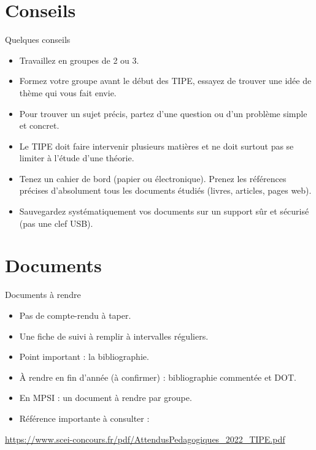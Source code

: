 \documentclass{beamer}
\begin{document}
\section{Conseils}
\begin{frame}{Quelques conseils}
    \begin{itemize}
        \item Travaillez en groupes de 2 ou 3.
        \item Formez votre groupe avant le début des TIPE, essayez de trouver une idée de thème qui vous fait envie. 
        \item Pour trouver un sujet précis, partez d'une question ou d'un problème simple et concret. 
        \item Le TIPE doit faire intervenir plusieurs matières et ne doit surtout pas se limiter à l'étude d'une théorie. 
        \item Tenez un cahier de bord (papier ou électronique). Prenez les références précises d'absolument tous les documents étudiés (livres, articles, pages web). 
        \item Sauvegardez systématiquement vos documents sur un support sûr et sécurisé (pas une clef USB). 
    \end{itemize}
\end{frame}

\section{Documents}
\begin{frame}{Documents à rendre}
    \begin{itemize}
        \item Pas de compte-rendu à taper. 
        \item Une fiche de suivi à remplir à intervalles réguliers. 
        \item Point important : la bibliographie. 
        \item À rendre en fin d'année (à confirmer) : bibliographie commentée et DOT. 
        \item En MPSI : un document à rendre par groupe. 
        \item Référence importante à consulter : 
    \end{itemize}

    \begin{center}
        \url{https://www.scei-concours.fr/pdf/AttendusPedagogiques_2022_TIPE.pdf}
    \end{center}
\end{frame}
\end{document}
